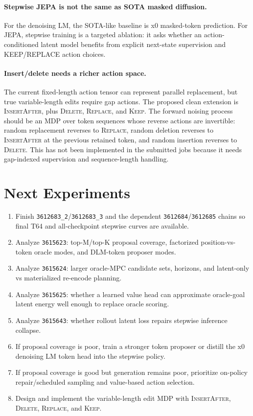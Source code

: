 \documentclass[11pt]{article}
\begin{document}
\paragraph{Stepwise JEPA is not the same as SOTA masked diffusion.}
For the denoising LM, the SOTA-like baseline is x0 masked-token prediction.  For
JEPA, stepwise training is a targeted ablation: it asks whether an
action-conditioned latent model benefits from explicit next-state supervision
and KEEP/REPLACE action choices.

\paragraph{Insert/delete needs a richer action space.}
The current fixed-length action tensor can represent parallel replacement, but
true variable-length edits require gap actions.  The proposed clean extension is
\textsc{InsertAfter}, plus \textsc{Delete}, \textsc{Replace}, and \textsc{Keep}.
The forward noising process should be an MDP over token sequences whose reverse
actions are invertible: random replacement reverses to \textsc{Replace}, random
deletion reverses to \textsc{InsertAfter} at the previous retained token, and
random insertion reverses to \textsc{Delete}.  This has not been implemented in
the submitted jobs because it needs gap-indexed supervision and sequence-length
handling.

\section{Next Experiments}

\begin{enumerate}[leftmargin=*]
\item Finish \texttt{3612683\_2}/\texttt{3612683\_3} and the dependent
  \texttt{3612684}/\texttt{3612685} chains so final T64 and all-checkpoint
  stepwise curves are available.
\item Analyze \texttt{3615623}: top-M/top-K proposal coverage, factorized
  position-vs-token oracle modes, and DLM-token proposer modes.
\item Analyze \texttt{3615624}: larger oracle-MPC candidate sets, horizons, and
  latent-only vs materialized re-encode planning.
\item Analyze \texttt{3615625}: whether a learned value head can approximate
  oracle-goal latent energy well enough to replace oracle scoring.
\item Analyze \texttt{3615643}: whether rollout latent loss repairs stepwise
  inference collapse.
\item If proposal coverage is poor, train a stronger token proposer or distill
  the x0 denoising LM token head into the stepwise policy.
\item If proposal coverage is good but generation remains poor, prioritize
  on-policy repair/scheduled sampling and value-based action selection.
\item Design and implement the variable-length edit MDP with
  \textsc{InsertAfter}, \textsc{Delete}, \textsc{Replace}, and \textsc{Keep}.
\end{enumerate}
\end{document}
